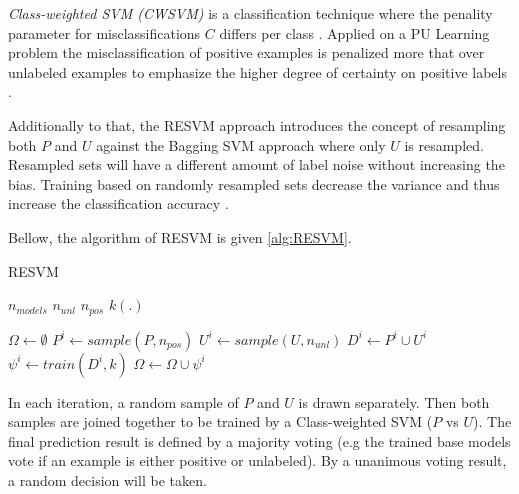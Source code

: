 \textit{Class-weighted SVM (CWSVM)} is a classification technique where the penality parameter for misclassifications \(C\) differs per class \cite{conf/icdm/LiuDLLY03}. Applied on a PU Learning problem the misclassification of positive examples is penalized more that over unlabeled examples to emphasize the higher degree of certainty on positive labels \cite{Claesen:2014}.

Additionally to that, the RESVM approach introduces the concept of resampling both \(P\) and \(U\) against the Bagging SVM approach where only \(U\) is resampled. Resampled sets will have a different amount of label noise without increasing the bias. Training based on randomly resampled sets decrease the variance and thus increase the classification accuracy \cite{journals/ml/Breiman00}.

Bellow, the algorithm of RESVM is given \ref{alg:RESVM}.

\begin{algorithm}[h!]                      
\caption{RESVM} 
\label{alg:RESVM}
\begin{algorithmic}[0]
        \State $ n_{models}  $ 
         \State $ n_{unl}  $ 
        \State $ n_{pos}  $  
        \State $ k(.)  $  
        
\end{algorithmic}
    \begin{algorithmic}[1]
       \State $\Omega    \gets \emptyset$  
            \State $P^i \gets sample(P,n_{pos}) $ 
            \State $U^i \gets sample(U,n_{unl}) $ 
            \State $ D^i \gets  P^i \cup U^i$ 
            \State $\psi^i \gets train(D^i,k) $ 
            \State $\Omega \gets \Omega \cup \psi^i $ 
   \end{algorithmic}
\end{algorithm}

In each iteration, a random sample of \(P\) and \(U\) is drawn separately. Then both samples are joined together to be trained by a Class-weighted SVM (\(P\) vs \(U\)). The final prediction result is defined by a majority voting (e.g the trained base models vote if an example is either positive or unlabeled). By a unanimous voting result, a random decision will be taken. 


